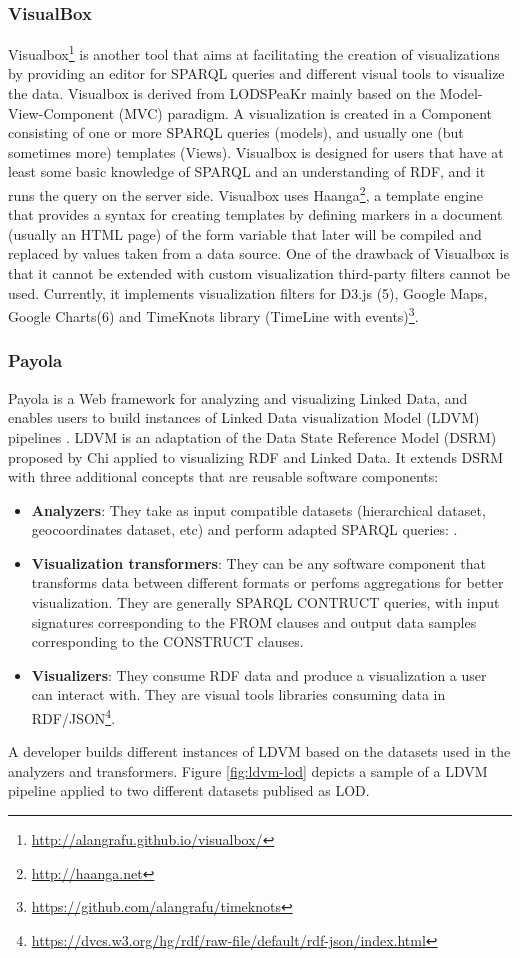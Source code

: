 \subsubsection{VisualBox}
Visualbox\footnote{\url{http://alangrafu.github.io/visualbox/}} is another tool that aims at facilitating the creation of visualizations by providing an editor for SPARQL queries and different visual tools to visualize the data. Visualbox is derived from LODSPeaKr \cite{graves13} mainly based on the Model-View-Component (MVC) paradigm. A visualization is created in a Component consisting of one or more SPARQL queries (models), and usually one (but sometimes more) templates (Views). Visualbox is designed for users that have at least some basic knowledge of SPARQL and an understanding of RDF, and it runs the query on the server side. Visualbox uses Haanga\footnote{\url{http://haanga.net}}, a template engine that provides a syntax for creating templates by defining markers in a document (usually an HTML page) of the form {{variable}} that later will be compiled and replaced by values taken from a data source. One of the drawback of Visualbox is that it cannot be extended with custom visualization third-party filters cannot be used. Currently, it implements visualization filters for D3.js (5), Google Maps, Google Charts(6) and TimeKnots library (TimeLine with events)\footnote{\url{https://github.com/alangrafu/timeknots}}.

\subsubsection{Payola}
Payola \cite{payola13} is a Web framework for analyzing and visualizing Linked Data, and enables users to build instances of Linked Data visualization Model (LDVM) pipelines \cite{brunetti13}. LDVM is an adaptation of the Data State Reference Model (DSRM) proposed by Chi \cite{chi2000} applied to visualizing RDF and Linked Data. It extends DSRM with three additional concepts that are reusable software components:
\begin{itemize}
\item \textbf{Analyzers}: They take as input compatible datasets (hierarchical dataset, geocoordinates dataset, etc) and perform adapted SPARQL queries: .
\item \textbf{Visualization transformers}: They can be any software component that transforms data between different formats or perfoms aggregations for better visualization. They are generally SPARQL CONTRUCT queries, with input signatures corresponding to the FROM clauses and output data samples corresponding to the CONSTRUCT clauses.
\item \textbf{Visualizers}: They consume RDF data and produce a visualization a user can interact with. They are visual tools libraries consuming data in RDF/JSON\footnote{\url{https://dvcs.w3.org/hg/rdf/raw-file/default/rdf-json/index.html}}.
\end{itemize}
A developer builds different instances of LDVM based on the datasets used in the analyzers and transformers. Figure \ref{fig:ldvm-lod} depicts a sample of a LDVM pipeline applied to two different datasets publised as LOD.

